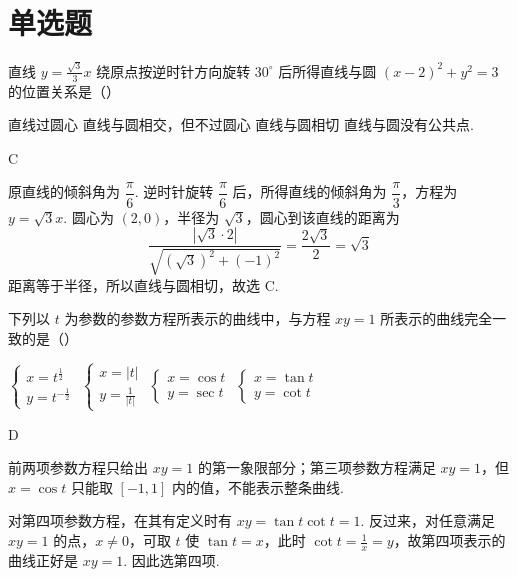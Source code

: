 \section{单选题}

\begin{problem}
直线 \(y = \frac{\sqrt{3}}{3}x\) 绕原点按逆时针方向旋转 \(30^\circ\) 后所得直线与圆 \(\left( x - 2 \right)^2 + y^2 = 3\) 的位置关系是（\quad）

\choices
    {直线过圆心}
    {直线与圆相交，但不过圆心}
    {直线与圆相切}
    {直线与圆没有公共点.}
\end{problem}

\begin{answer}
C
\end{answer}

\begin{solution}
原直线的倾斜角为 \(\dfrac\pi6\). 逆时针旋转 \(\dfrac\pi6\) 后，所得直线的倾斜角为 \(\dfrac\pi3\)，方程为 \(y=\sqrt3x\). 圆心为 \((2,0)\)，半径为 \(\sqrt3\)，圆心到该直线的距离为
\[
\frac{|\sqrt3\cdot2|}{\sqrt{(\sqrt3)^2+(-1)^2}}=\frac{2\sqrt3}{2}=\sqrt3
\]
距离等于半径，所以直线与圆相切，故选 C.
\end{solution}

\begin{problem}
下列以 \(t\) 为参数的参数方程所表示的曲线中，与方程 \(xy = 1\) 所表示的曲线完全一致的是（\quad）

\choices
    {\(\begin{cases}
        x = t^{\frac{1}{2}} \\
        y = t^{-\frac{1}{2}}
    \end{cases}\)}
    {\(\begin{cases}
        x = |t| \\
        y = \frac{1}{|t|}
    \end{cases}\)}
    {\(\begin{cases}
        x = \cos t \\
        y = \sec t
    \end{cases}\)}
    {\(\begin{cases}
        x = \tan t \\
        y = \cot t
    \end{cases}\)}
\end{problem}

\begin{answer}
D
\end{answer}

\begin{solution}
前两项参数方程只给出 \(xy=1\) 的第一象限部分；第三项参数方程满足 \(xy=1\)，但 \(x=\cos t\) 只能取 \([-1,1]\) 内的值，不能表示整条曲线.

对第四项参数方程，在其有定义时有 \(xy=\tan t\cot t=1\). 反过来，对任意满足 \(xy=1\) 的点，\(x\ne0\)，可取 \(t\) 使 \(\tan t=x\)，此时 \(\cot t=\frac{1}{x}=y\)，故第四项表示的曲线正好是 \(xy=1\). 因此选第四项.
\end{solution}

